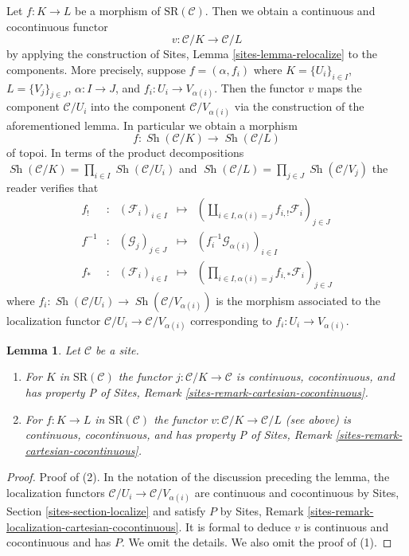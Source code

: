 \documentclass{stacks-project}
\theoremstyle{plain}
\newtheorem{lemma}[subsection]{Lemma}
\theoremstyle{definition}
\theoremstyle{remark}
\numberwithin{equation}{subsection}
\def\Sh{\mathop{\mathit{Sh}}\nolimits}
\begin{document}
\medskip\noindent
Let $f : K \to L$ be a morphism of $\text{SR}(\mathcal{C})$.
Then we obtain a continuous and cocontinuous functor
$$
v : \mathcal{C}/K \longrightarrow \mathcal{C}/L
$$
by applying the construction of Sites, Lemma \ref{sites-lemma-relocalize}
to the components. More precisely, suppose $f = (\alpha, f_i)$
where $K = \{U_i\}_{i \in I}$, $L = \{V_j\}_{j \in J}$, $\alpha : I \to J$,
and $f_i : U_i \to V_{\alpha(i)}$. Then the functor $v$ maps the component
$\mathcal{C}/U_i$ into the component $\mathcal{C}/V_{\alpha(i)}$
via the construction of the aforementioned lemma. In particular
we obtain a morphism
$$
f : \Sh(\mathcal{C}/K) \to \Sh(\mathcal{C}/L)
$$
of topoi. In terms of the product decompositions
$\Sh(\mathcal{C}/K) = \prod\nolimits_{i \in I} \Sh(\mathcal{C}/U_i)$ and
$\Sh(\mathcal{C}/L) = \prod\nolimits_{j \in J} \Sh(\mathcal{C}/V_j)$
the reader verifies that
$$
\begin{matrix}
f_! & : &
(\mathcal{F}_i)_{i \in I} &
\longmapsto &
(\coprod\nolimits_{i \in I, \alpha(i) = j} f_{i, !}\mathcal{F}_i)_{j \in J} \\
f^{-1} & : &
(\mathcal{G}_j)_{j \in J} &
\longmapsto &
(f_i^{-1}\mathcal{G}_{\alpha(i)})_{i \in I} \\
f_* & : &
(\mathcal{F}_i)_{i \in I} &
\longmapsto &
(\prod\nolimits_{i \in I, \alpha(i) = j} f_{i, *}\mathcal{F}_i)_{j \in J}
\end{matrix}
$$
where $f_i : \Sh(\mathcal{C}/U_i) \to \Sh(\mathcal{C}/V_{\alpha(i)})$
is the morphism associated to the localization functor
$\mathcal{C}/U_i \to \mathcal{C}/V_{\alpha(i)}$ corresponding to
$f_i : U_i \to V_{\alpha(i)}$.

\begin{lemma}
\label{lemma-has-P}
Let $\mathcal{C}$ be a site.
\begin{enumerate}
\item For $K$ in $\text{SR}(\mathcal{C})$ the functor
$j : \mathcal{C}/K \to \mathcal{C}$ is continuous,
cocontinuous, and has property P of
Sites, Remark \ref{sites-remark-cartesian-cocontinuous}.
\item For $f : K \to L$ in $\text{SR}(\mathcal{C})$
the functor $v : \mathcal{C}/K \to \mathcal{C}/L$ (see above)
is continuous, cocontinuous, and has property P of
Sites, Remark \ref{sites-remark-cartesian-cocontinuous}.
\end{enumerate}
\end{lemma}

\begin{proof}
Proof of (2). In the notation of the discussion preceding the lemma,
the localization functors $\mathcal{C}/U_i \to \mathcal{C}/V_{\alpha(i)}$
are continuous and cocontinuous by
Sites, Section \ref{sites-section-localize}
and satisfy $P$ by
Sites, Remark \ref{sites-remark-localization-cartesian-cocontinuous}.
It is formal to deduce $v$ is continuous and cocontinuous and has $P$.
We omit the details. We also omit the proof of (1).
\end{proof}
\end{document}
